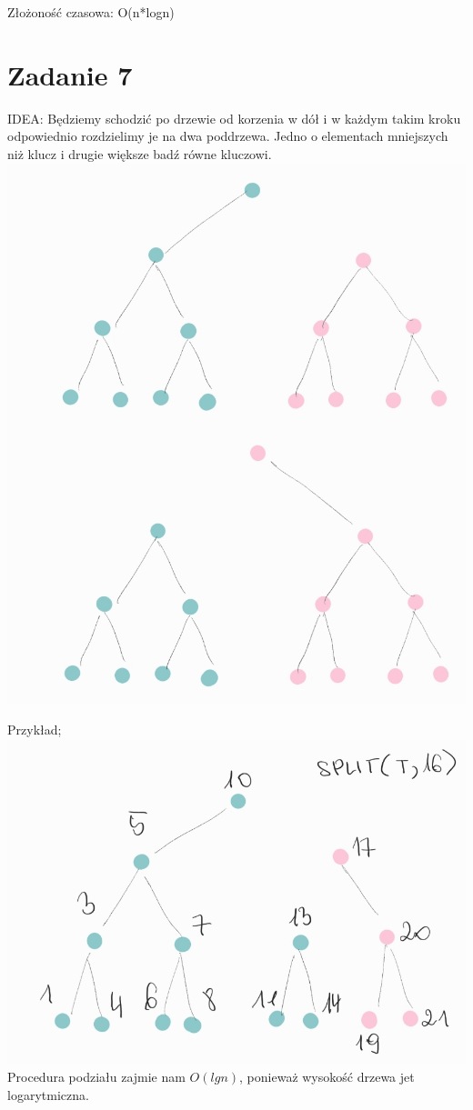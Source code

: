 \documentclass[12pt]{article}
\begin{document}
Złożoność czasowa: O(n*logn)

\section{Zadanie 7}

IDEA:
Będziemy schodzić po drzewie od korzenia w dół i w każdym takim kroku odpowiednio rozdzielimy je na dwa poddrzewa. Jedno o elementach mniejszych niż klucz i drugie większe badź równe kluczowi.
\includegraphics[scale=0.5]{7_1.png}

Przykład;
\includegraphics[scale=0.5]{7_2.png}
Procedura podziału zajmie nam $O(lg n)$, ponieważ wysokość drzewa jet logarytmiczna.
\end{document}
